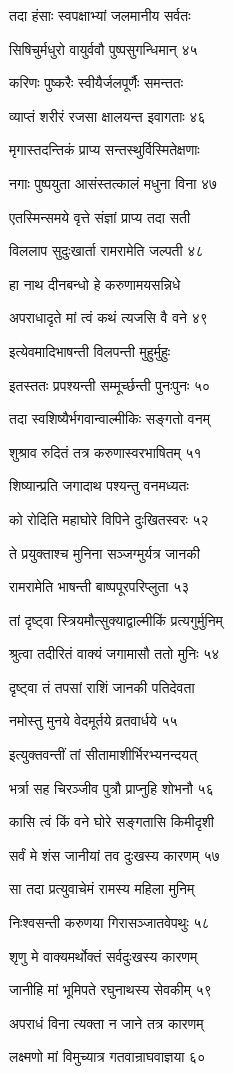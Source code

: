 तदा हंसाः स्वपक्षाभ्यां जलमानीय सर्वतः

सिषिचुर्मधुरो वायुर्ववौ पुष्पसुगन्धिमान् ४५

करिणः पुष्करैः स्वीयैर्जलपूर्णैः समन्ततः

व्याप्तं शरीरं रजसा क्षालयन्त इवागताः ४६

मृगास्तदन्तिकं प्राप्य सन्तस्थुर्विस्मितेक्षणाः

नगाः पुष्पयुता आसंस्तत्कालं मधुना विना ४७

एतस्मिन्समये वृत्ते संज्ञां प्राप्य तदा सती

विललाप सुदुःखार्ता रामरामेति जल्पती ४८

हा नाथ दीनबन्धो हे करुणामयसन्निधे

अपराधादृते मां त्वं कथं त्यजसि वै वने ४९

इत्येवमादिभाषन्ती विलपन्ती मुहुर्मुहुः

इतस्ततः प्रपश्यन्ती सम्मूर्च्छन्ती पुनःपुनः ५०

तदा स्वशिष्यैर्भगवान्वाल्मीकिः सङ्गतो वनम्

शुश्राव रुदितं तत्र करुणास्वरभाषितम् ५१

शिष्यान्प्रति जगादाथ पश्यन्तु वनमध्यतः

को रोदिति महाघोरे विपिने दुःखितस्वरः ५२

ते प्रयुक्ताश्च मुनिना सञ्जग्मुर्यत्र जानकी

रामरामेति भाषन्ती बाष्पपूरपरिप्लुता ५३

तां दृष्ट्वा स्त्रियमौत्सुक्याद्वाल्मीकिं प्रत्यगुर्मुनिम्

श्रुत्वा तदीरितं वाक्यं जगामासौ ततो मुनिः ५४

दृष्ट्वा तं तपसां राशिं जानकी पतिदेवता

नमोस्तु मुनये वेदमूर्तये व्रतवार्धये ५५

इत्युक्तवन्तीं तां सीतामाशीर्भिरभ्यनन्दयत्

भर्त्रा सह चिरञ्जीव पुत्रौ प्राप्नुहि शोभनौ ५६

कासि त्वं किं वने घोरे सङ्गतासि किमीदृशी

सर्वं मे शंस जानीयां तव दुःखस्य कारणम् ५७

सा तदा प्रत्युवाचेमं रामस्य महिला मुनिम्

निःश्वसन्ती करुणया गिरासञ्जातवेपथुः ५८

शृणु मे वाक्यमर्थोक्तं सर्वदुःखस्य कारणम्

जानीहि मां भूमिपते रघुनाथस्य सेवकीम् ५९

अपराधं विना त्यक्ता न जाने तत्र कारणम्

लक्ष्मणो मां विमुच्यात्र गतवान्राघवाज्ञया ६०

